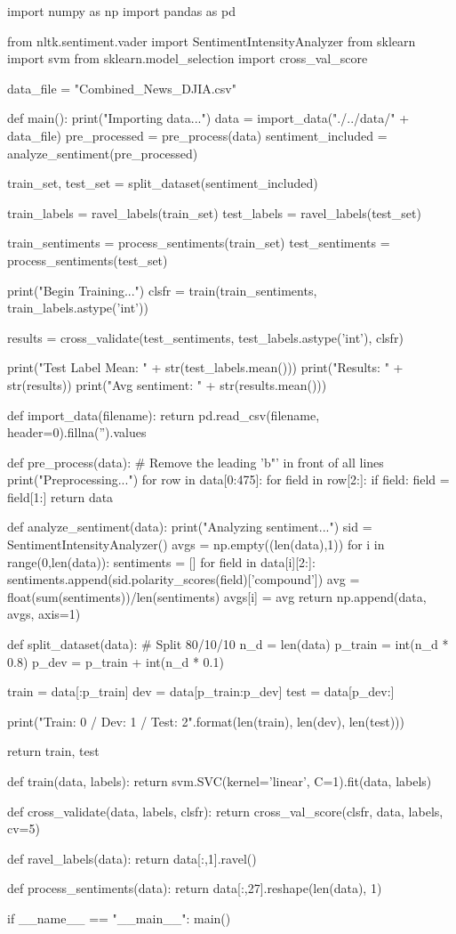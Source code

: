 \documentclass{article} %
\begin{document}
\begin{python}
import numpy as np
import pandas as pd

from nltk.sentiment.vader import SentimentIntensityAnalyzer
from sklearn import svm
from sklearn.model_selection import cross_val_score

data_file = "Combined_News_DJIA.csv"

def main():
  print("Importing data...")
  data = import_data("./../data/" + data_file)
  pre_processed = pre_process(data)
  sentiment_included = analyze_sentiment(pre_processed)

  train_set, test_set = split_dataset(sentiment_included)

  train_labels = ravel_labels(train_set)
  test_labels = ravel_labels(test_set)

  train_sentiments = process_sentiments(train_set)
  test_sentiments = process_sentiments(test_set)

  print("Begin Training...")
  clsfr = train(train_sentiments, train_labels.astype('int'))

  results = cross_validate(test_sentiments, test_labels.astype('int'), clsfr)

  print("Test Label Mean: " + str(test_labels.mean()))
  print("Results: " + str(results))
  print("Avg sentiment: " + str(results.mean()))

def import_data(filename):
  return pd.read_csv(filename, header=0).fillna('').values

def pre_process(data):
  # Remove the leading 'b"' in front of all lines
  print("Preprocessing...")
  for row in data[0:475]:
    for field in row[2:]:
      if field:
        field = field[1:]
  return data

def analyze_sentiment(data):
  print("Analyzing sentiment...")
  sid = SentimentIntensityAnalyzer()
  avgs = np.empty((len(data),1))
  for i in range(0,len(data)):
    sentiments = []
    for field in data[i][2:]:
      sentiments.append(sid.polarity_scores(field)['compound'])
    avg = float(sum(sentiments))/len(sentiments)
    avgs[i] = avg
  return np.append(data, avgs, axis=1)

def split_dataset(data):
  # Split 80/10/10
  n_d = len(data)
  p_train = int(n_d * 0.8)
  p_dev = p_train + int(n_d * 0.1)

  train = data[:p_train]
  dev = data[p_train:p_dev]
  test = data[p_dev:]

  print("Train: {0} / Dev: {1} / Test: {2}".format(len(train), len(dev), len(test)))

  return train, test

def train(data, labels):
  return svm.SVC(kernel='linear', C=1).fit(data, labels)

def cross_validate(data, labels, clsfr):
  return cross_val_score(clsfr, data, labels, cv=5)

def ravel_labels(data):
  return data[:,1].ravel()

def process_sentiments(data):
  return data[:,27].reshape(len(data), 1)

if __name__ == "__main__":
  main()
\end{python}
\end{document}
